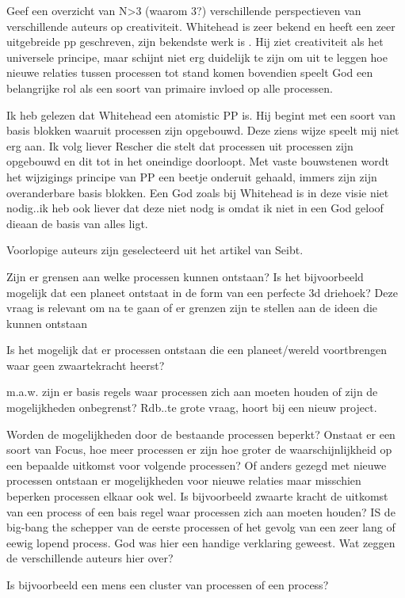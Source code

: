 \documentclass[a4paper]{Thesis}
\begin{document}
Geef een overzicht van N>3 (waarom 3?) verschillende perspectieven van verschillende auteurs op creativiteit. Whitehead is zeer bekend en heeft een zeer uitgebreide pp geschreven, zijn bekendste werk is \cite{whitehead1929process}. Hij ziet creativiteit als het universele principe, maar schijnt niet erg duidelijk te zijn om uit te leggen hoe nieuwe relaties tussen processen tot stand komen bovendien speelt God een belangrijke rol als een soort van primaire invloed op alle processen.

Ik heb gelezen dat Whitehead een atomistic PP is. Hij begint met een soort van basis blokken waaruit processen zijn opgebouwd. Deze ziens wijze speelt mij niet erg aan. Ik volg liever Rescher die stelt dat processen uit processen zijn opgebouwd en dit tot in het oneindige doorloopt. Met vaste bouwstenen wordt het wijzigings principe van PP een beetje onderuit gehaald, immers zijn zijn overanderbare basis blokken. Een God zoals bij Whitehead is in deze visie niet nodig..ik heb ook liever dat deze niet nodg is omdat ik niet in een God geloof dieaan de basis van alles ligt.

Voorlopige auteurs zijn geselecteerd uit het artikel van Seibt.

Zijn er grensen aan welke processen kunnen ontstaan? Is het bijvoorbeeld mogelijk dat een planeet ontstaat in de form van een perfecte 3d driehoek?
Deze vraag is relevant om na te gaan of er grenzen zijn te stellen aan de ideen die kunnen ontstaan

Is het mogelijk dat er processen ontstaan die een planeet/wereld voortbrengen waar geen zwaartekracht heerst?

m.a.w. zijn er basis regels waar processen zich aan moeten houden of zijn de mogelijkheden onbegrenst? 
Rdb..te grote vraag, hoort bij een nieuw project.

Worden de mogelijkheden door de bestaande processen beperkt? Onstaat er een soort van Focus, hoe meer processen er zijn hoe groter de waarschijnlijkheid op een bepaalde uitkomst voor volgende processen? Of anders gezegd met nieuwe processen ontstaan er mogelijkheden voor nieuwe relaties maar misschien beperken processen elkaar ook wel.
Is bijvoorbeeld zwaarte kracht de uitkomst van een process of een bais regel waar processen zich aan moeten houden?
IS de big-bang the schepper van de eerste processen of het gevolg van een zeer lang of eewig lopend process. God was hier een handige verklaring geweest.
Wat zeggen de verschillende auteurs hier over?

Is bijvoorbeeld een mens een cluster van processen of een process?
\end{document}
